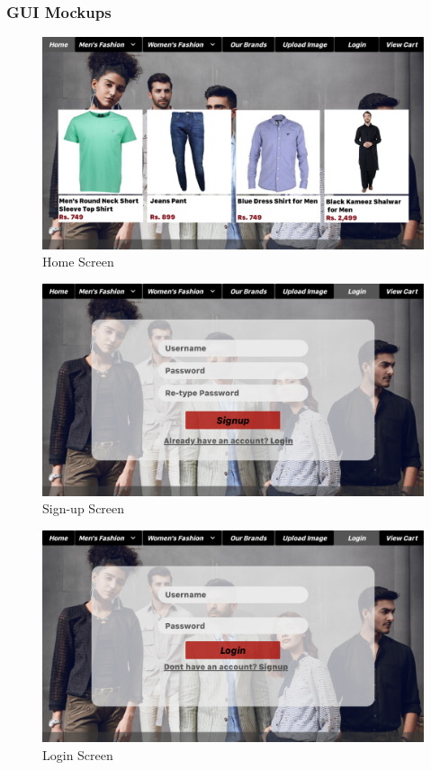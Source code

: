 \subsubsection{GUI Mockups}
\begin{figure}[H]
\includegraphics[width=15cm]{images/HomeScreen.pdf} 
\centering
\caption{Home Screen}
\label{gui:home}
\end{figure}

 \begin{figure}[H]
  \includegraphics[width=15cm]{images/SignupScreen.pdf} 
  \centering
  \caption{Sign-up Screen}
  \label{gui:sign}
  \end{figure}

  \begin{figure}[!htb]
  \includegraphics[width=15cm]{images/LoginScreen.pdf} 
  \centering
  \caption{Login Screen}
  \label{gui:login}
  \end{figure}

